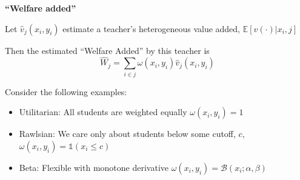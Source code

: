 \documentclass[t,aspectratio=169,11pt,presentation]{beamer}
\newenvironment{wideitemize}{\itemize\addtolength{\itemsep}{14pt}}{\enditemize}
\begin{document}
\begin{frame}{\textbf{``Welfare added''}}

\begin{wideitemize}

    \item Let $\hat{v}_j(x_i,y_i)$ estimate a teacher's heterogeneous value added, $\mathbb{E}[v(\cdot)|x_i,j]$
    
    \item Then the estimated ``Welfare Added'' by this teacher is  
    \[
    \hat{W}_j  = \sum_{i\in j} \omega(x_i,y_i) \hat{v}_j(x_i,y_i) 
    \] 
    
    \item Consider the following examples:
    \begin{itemize}
        \item Utilitarian: All students are weighted equally $\omega(x_i,y_i) = 1$
        \item Rawlsian: We care only about students below some cutoff, $c$, $\omega(x_i,y_i) = \mathds{1}(x_i\leq c)$
        \item Beta: Flexible with monotone derivative $ \omega(x_i,y_i)=  \mathcal{B}(x_i;\alpha,\beta)$ 
        
    \end{itemize}
    

\end{wideitemize}


\end{frame}
\end{document}
